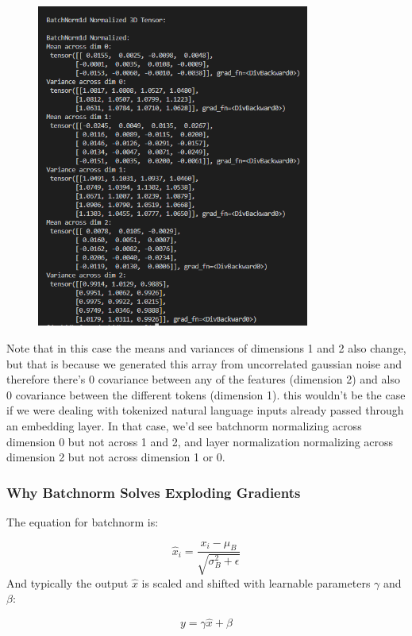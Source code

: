 \documentclass[12pt]{article}
\begin{document}
\begin{figure}[H]
    \centering
    \includegraphics[width=0.8\textwidth]{./batchnormed.png} %
\end{figure}

Note that in this case the means and variances of dimensions 1 and 2 also change, but that is because we generated this array from uncorrelated gaussian noise and therefore there's 0 covariance between any of the features (dimension 2) and also 0 covariance between the different tokens (dimension 1). this wouldn't be the case if we were dealing with tokenized natural language inputs already passed through an embedding layer. In that case, we'd see batchnorm normalizing across dimension 0 but not across 1 and 2, and layer normalization normalizing across dimension 2 but not across dimension 1 or 0. 


\subsubsection{Why Batchnorm Solves Exploding Gradients} 
The equation for batchnorm is:

\[ \hat{x}_i = \frac{x_i - \mu_B}{\sqrt{\sigma_B^2 + \epsilon}} \]
And typically the output \(\hat{x}\) is scaled and shifted with learnable parameters \(\gamma\) and \(\beta\):

\[y = \gamma \hat{x} + \beta\]
\end{document}
